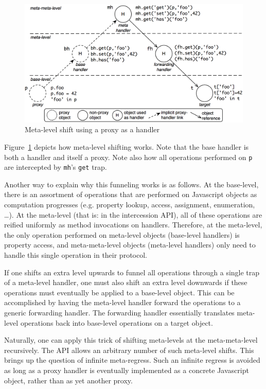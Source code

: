 \documentclass{sig-alternate}
\begin{document}
\begin{figure}[htbp]
  \centering
    \includegraphics[width=1.0\columnwidth]{MetaLevelShifting.png}
  \caption{Meta-level shift using a proxy as a handler}
  \label{fig:shift}
\end{figure}

Figure~\ref{fig:shift} depicts how meta-level shifting works. Note that the base handler is both a handler and itself a proxy. Note also how all operations performed on \texttt{p} are intercepted by \texttt{mh}'s \texttt{get} trap.

Another way to explain why this funneling works is as follows. At the base-level, there is an assortment of operations that are performed on Javascript objects as computation progresses (e.g. property lookup, access, assignment, enumeration, \ldots). At the meta-level (that is: in the intercession API), all of these operations are reified uniformly as method invocations on handlers. Therefore, at the meta-level, the only operation performed on meta-level objects (base-level handlers) is property access, and meta-meta-level objects (meta-level handlers) only need to handle this single operation in their protocol.

If one shifts an extra level upwards to funnel all operations through a single trap of a meta-level handler, one must also shift an extra level downwards if these operations must eventually be applied to a base-level object. This can be accomplished by having the meta-level handler forward the operations to a generic forwarding handler. The forwarding handler essentially translates meta-level operations back into base-level operations on a target object.

Naturally, one can apply this trick of shifting meta-levels at the meta-meta-level recursively. The API allows an arbitrary number of such meta-level shifts. This brings up the question of infinite meta-regress. Such an infinite regress is avoided as long as a proxy handler is eventually implemented as a concrete Javascript object, rather than as yet another proxy.
\end{document}
